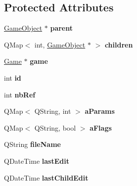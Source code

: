 \subsection*{\-Protected \-Attributes}
\begin{DoxyCompactItemize}
\item 
\hypertarget{class_game_object_a4113a496ed45ca90756cfa0d8dfe6171}{\hyperlink{class_game_object}{\-Game\-Object} $\ast$ {\bfseries parent}}\label{class_game_object_a4113a496ed45ca90756cfa0d8dfe6171}

\item 
\hypertarget{class_game_object_a096e6989277570032586b162e5802181}{\-Q\-Map$<$ int, \hyperlink{class_game_object}{\-Game\-Object} $\ast$ $>$ {\bfseries children}}\label{class_game_object_a096e6989277570032586b162e5802181}

\item 
\hypertarget{class_game_object_a338ed91d0ad6aebe8a8d3adf8c75752b}{\hyperlink{class_game}{\-Game} $\ast$ {\bfseries game}}\label{class_game_object_a338ed91d0ad6aebe8a8d3adf8c75752b}

\item 
\hypertarget{class_game_object_a98291c60da12d9036e1ad24cfebcf6b3}{int {\bfseries id}}\label{class_game_object_a98291c60da12d9036e1ad24cfebcf6b3}

\item 
\hypertarget{class_game_object_a1873810f18db1e1faecc04e0ab92c512}{int {\bfseries nb\-Ref}}\label{class_game_object_a1873810f18db1e1faecc04e0ab92c512}

\item 
\hypertarget{class_game_object_ab5ed36754a777ef648dd6831c0b1d6fb}{\-Q\-Map$<$ \-Q\-String, int $>$ {\bfseries a\-Params}}\label{class_game_object_ab5ed36754a777ef648dd6831c0b1d6fb}

\item 
\hypertarget{class_game_object_ade46e4f590a01cab331d12d0da644625}{\-Q\-Map$<$ \-Q\-String, bool $>$ {\bfseries a\-Flags}}\label{class_game_object_ade46e4f590a01cab331d12d0da644625}

\item 
\hypertarget{class_game_object_a8e62a0d6755b2930090348622f482f6d}{\-Q\-String {\bfseries file\-Name}}\label{class_game_object_a8e62a0d6755b2930090348622f482f6d}

\item 
\hypertarget{class_game_object_ac1a61f57d5a318b86c4f2bbb4dbde78f}{\-Q\-Date\-Time {\bfseries last\-Edit}}\label{class_game_object_ac1a61f57d5a318b86c4f2bbb4dbde78f}

\item 
\hypertarget{class_game_object_ae0a43c76fc9171015b43d008b5ffcbfd}{\-Q\-Date\-Time {\bfseries last\-Child\-Edit}}\label{class_game_object_ae0a43c76fc9171015b43d008b5ffcbfd}

\end{DoxyCompactItemize}


